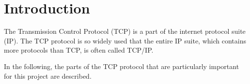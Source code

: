 \section{Introduction}
The Transmission Control Protocol (TCP) is a part of the internet protocol suite (IP). The TCP protocol is so widely used that the entire IP suite, which contains more protocols than TCP, is often called TCP/IP.

In the following, the parts of the TCP protocol that are particularly important for this project are described.